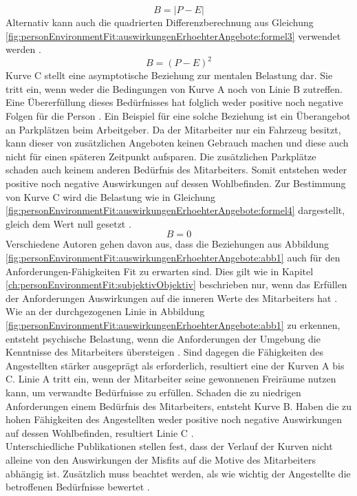 \begin{equation}
	B = |P - E|
	\label{fig:personEnvironmentFit:auswirkungenErhoehterAngebote:formel2}
\end{equation}
Alternativ kann auch die quadrierten Differenzberechnung aus Gleichung \ref{fig:personEnvironmentFit:auswirkungenErhoehterAngebote:formel3} verwendet werden \cite[S. 2]{edwards:1993}.
\begin{equation}
	B = (P - E)^2
	\label{fig:personEnvironmentFit:auswirkungenErhoehterAngebote:formel3}
\end{equation}
Kurve C stellt eine asymptotische Beziehung zur mentalen Belastung dar. Sie tritt ein, wenn weder die Bedingungen von Kurve A noch von Linie B zutreffen. Eine Übererfüllung dieses Bedürfnisses hat folglich weder positive noch negative Folgen für die Person \cite{mechanismsOfJobStressAndStrain:1982}. Ein Beispiel für eine solche Beziehung ist ein Überangebot an Parkplätzen beim Arbeitgeber. Da der Mitarbeiter nur ein Fahrzeug besitzt, kann dieser von zusätzlichen Angeboten keinen Gebrauch machen und diese auch nicht für einen späteren Zeitpunkt aufsparen. Die zusätzlichen Parkplätze schaden auch keinem anderen Bedürfnis des Mitarbeiters. Somit entstehen weder positive noch negative Auswirkungen auf dessen Wohlbefinden. Zur Bestimmung von Kurve C wird die Belastung wie in Gleichung \ref{fig:personEnvironmentFit:auswirkungenErhoehterAngebote:formel4} dargestellt, gleich dem Wert null gesetzt \cite[S. 2]{edwards:1993}.
\begin{equation}
	B = 0
	\label{fig:personEnvironmentFit:auswirkungenErhoehterAngebote:formel4}
\end{equation}
Verschiedene Autoren gehen davon aus, dass die Beziehungen aus Abbildung \ref{fig:personEnvironmentFit:auswirkungenErhoehterAngebote:abb1} auch für den Anforderungen-Fähigkeiten Fit zu erwarten sind. Dies gilt wie in Kapitel \ref{ch:personEnvironmentFit:subjektivObjektiv} beschrieben nur, wenn das Erfüllen der Anforderungen Auswirkungen auf die inneren Werte des Mitarbeiters hat \cite{mechanismsOfJobStressAndStrain:1982, harrison:1978}. Wie an der durchgezogenen Linie in Abbildung \ref{fig:personEnvironmentFit:auswirkungenErhoehterAngebote:abb1} zu erkennen, entsteht psychische Belastung, wenn die Anforderungen der Umgebung die Kenntnisse des Mitarbeiters übersteigen \cite[S. 5]{schuler:1980}. Sind dagegen die Fähigkeiten des Angestellten stärker ausgeprägt als erforderlich, resultiert eine der Kurven A bis C. Linie A tritt ein, wenn der Mitarbeiter seine gewonnenen Freiräume nutzen kann, um verwandte Bedürfnisse zu erfüllen. Schaden die zu niedrigen Anforderungen einem Bedürfnis des Mitarbeiters, entsteht Kurve B. Haben die zu hohen Fähigkeiten des Angestellten weder positive noch negative Auswirkungen auf dessen Wohlbefinden, resultiert Linie C \cite[S. 22f.]{edwards:2008}.\\
Unterschiedliche Publikationen stellen fest, dass der Verlauf der Kurven nicht alleine von den Auswirkungen der Misfits auf die Motive des Mitarbeiters abhängig ist. Zusätzlich muss beachtet werden, als wie wichtig der Angestellte die betroffenen Bedürfnisse bewertet \cite[S. 9f.]{edwards:1996}. 

